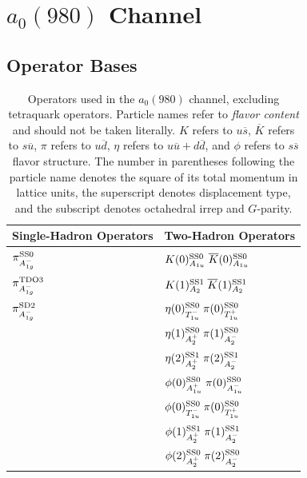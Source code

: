 \section{$a_0(980)$ Channel}
\subsection{Operator Bases}
\begin{table}
  \centering
  \begin{tabular}{l|l}
    \textbf{Single-Hadron Operators} & \textbf{Two-Hadron Operators}\\
    \hline
    $\pi^{\rm{SS}0}_{A_{1g}^-}$ & $K(0)^{\rm{SS}0}_{A_{1u}}\; \overline K(0)^{\rm{SS}0}_{A_{1u}}$\\
    $\pi^{\rm{TDO}3}_{A_{1g}^-}$ & $K(1)^{\rm{SS}1}_{A_{2}}\; \overline K(1)^{\rm{SS}1}_{A_{2}}$ \\
    $\pi^{\rm{SD}2}_{A_{1g}^-}$ & $\eta(0)^{\rm{SS}0}_{T_{1u}^-}\; \pi(0)^{\rm{SS}0}_{T_{1u}^+}$ \\
    & $\eta(1)^{\rm{SS}0}_{A_{2}^+}\; \pi(1)^{\rm{SS}0}_{A_{2}^-}$ \\
    & $\eta(2)^{\rm{SS}1}_{A_{2}^+}\; \pi(2)^{\rm{SS}1}_{A_{2}^-}$ \\
    & $\phi(0)^{\rm{SS}0}_{A_{1u}^+}\; \pi(0)^{\rm{SS}0}_{A_{1u}^-}$ \\
    & $\phi(0)^{\rm{SS}0}_{T_{1u}^-}\; \pi(0)^{\rm{SS}0}_{T_{1u}^+}$ \\
    & $\phi(1)^{\rm{SS}1}_{A_{2}^+}\; \pi(1)^{\rm{SS}1}_{A_{2}^-}$ \\
    & $\phi(2)^{\rm{SS}0}_{A_{2}^+}\; \pi(2)^{\rm{SS}0}_{A_{2}^-}$ 
  \end{tabular}
  \caption{Operators used in the $a_0(980)$ channel, excluding tetraquark operators. Particle names refer to \emph{flavor content} and should not be taken literally. $K$ refers to $u\overline s$, $\overline K$ refers to $s \overline u$, $\pi$ refers to $u\overline d$, $\eta$ refers to $u\overline u + d\overline d$, and $\phi$ refers to $s\overline s$ flavor structure. The number in parentheses following the particle name denotes the square of its total momentum in lattice units, the superscript denotes displacement type, and the subscript denotes octahedral irrep and $G$-parity.}
  \label{table:a0_ops_no_tq}
\end{table}
